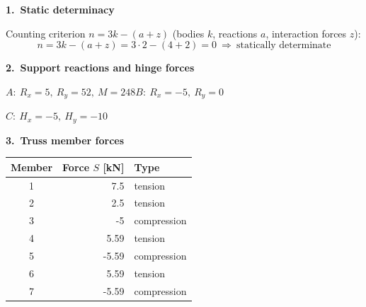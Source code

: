 \documentclass[a4paper,11pt]{article}
\begin{document}
\par\medskip\textbf{1.\ Static determinacy}\par Counting criterion $n=3k-(a+z)$ (bodies $k$, reactions $a$, interaction forces $z$):
\[ n=3k-(a+z)=3\cdot2-(4+2)=0\ \Rightarrow\ \text{statically determinate} \]
\par\medskip\textbf{2.\ Support reactions and hinge forces}\par
$A:\ R_x=5,\ R_y=52,\ M=248$\quad $B:\ R_x=-5,\ R_y=0$\par $C:\ H_x=-5,\ H_y=-10$
\par\medskip\textbf{3.\ Truss member forces}\par
\begin{center}\renewcommand{\arraystretch}{1.1}\begin{tabular}{c r l}
\toprule
Member & Force $S$ [kN] & Type \\
\midrule
  1 & 7.5 & tension \\
  2 & 2.5 & tension \\
  3 & -5 & compression \\
  4 & 5.59 & tension \\
  5 & -5.59 & compression \\
  6 & 5.59 & tension \\
  7 & -5.59 & compression \\
\bottomrule
\end{tabular}\end{center}
\end{document}
